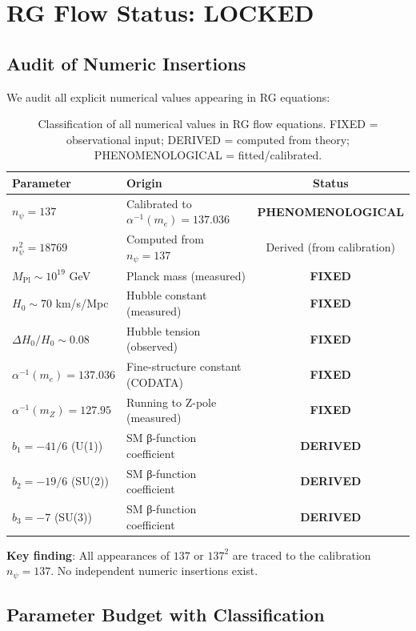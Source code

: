 \documentclass[12pt]{article}
\begin{document}
\section{RG Flow Status: LOCKED}

\subsection{Audit of Numeric Insertions}

We audit all explicit numerical values appearing in RG equations:

\begin{table}[h]
\centering
\small
\begin{tabular}{|l|l|c|}
\hline
\textbf{Parameter} & \textbf{Origin} & \textbf{Status} \\
\hline
$n_\psi = 137$ & Calibrated to $\alpha^{-1}(m_e) = 137.036$ & \textbf{PHENOMENOLOGICAL} \\
$n_\psi^2 = 18769$ & Computed from $n_\psi = 137$ & Derived (from calibration) \\
$M_{\text{Pl}} \sim 10^{19}$ GeV & Planck mass (measured) & \textbf{FIXED} \\
$H_0 \sim 70$ km/s/Mpc & Hubble constant (measured) & \textbf{FIXED} \\
$\Delta H_0/H_0 \sim 0.08$ & Hubble tension (observed) & \textbf{FIXED} \\
$\alpha^{-1}(m_e) = 137.036$ & Fine-structure constant (CODATA) & \textbf{FIXED} \\
$\alpha^{-1}(m_Z) = 127.95$ & Running to Z-pole (measured) & \textbf{FIXED} \\
$b_1 = -41/6$ (U(1)) & SM β-function coefficient & \textbf{DERIVED} \\
$b_2 = -19/6$ (SU(2)) & SM β-function coefficient & \textbf{DERIVED} \\
$b_3 = -7$ (SU(3)) & SM β-function coefficient & \textbf{DERIVED} \\
\hline
\end{tabular}
\caption{Classification of all numerical values in RG flow equations. FIXED = observational input; DERIVED = computed from theory; PHENOMENOLOGICAL = fitted/calibrated.}
\label{tab:parameter_classification}
\end{table}

\textbf{Key finding}: All appearances of $137$ or $137^2$ are traced to the calibration $n_\psi = 137$. No independent numeric insertions exist.

\subsection{Parameter Budget with Classification}
\end{document}
